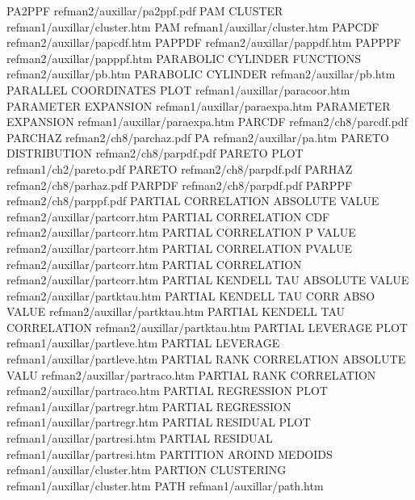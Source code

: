 PA2PPF                                  refman2/auxillar/pa2ppf.pdf
PAM CLUSTER                             refman1/auxillar/cluster.htm
PAM                                     refman1/auxillar/cluster.htm
PAPCDF                                  refman2/auxillar/papcdf.htm
PAPPDF                                  refman2/auxillar/pappdf.htm
PAPPPF                                  refman2/auxillar/papppf.htm
PARABOLIC CYLINDER FUNCTIONS            refman2/auxillar/pb.htm
PARABOLIC CYLINDER                      refman2/auxillar/pb.htm
PARALLEL COORDINATES PLOT               refman1/auxillar/paracoor.htm
PARAMETER EXPANSION                     refman1/auxillar/paraexpa.htm
PARAMETER EXPANSION                     refman1/auxillar/paraexpa.htm
PARCDF                                  refman2/ch8/parcdf.pdf
PARCHAZ                                 refman2/ch8/parchaz.pdf
PA                                      refman2/auxillar/pa.htm
PARETO DISTRIBUTION                     refman2/ch8/parpdf.pdf
PARETO PLOT                             refman1/ch2/pareto.pdf
PARETO                                  refman2/ch8/parpdf.pdf
PARHAZ                                  refman2/ch8/parhaz.pdf
PARPDF                                  refman2/ch8/parpdf.pdf
PARPPF                                  refman2/ch8/parppf.pdf
PARTIAL CORRELATION ABSOLUTE VALUE      refman2/auxillar/partcorr.htm
PARTIAL CORRELATION CDF                 refman2/auxillar/partcorr.htm
PARTIAL CORRELATION P VALUE             refman2/auxillar/partcorr.htm
PARTIAL CORRELATION PVALUE              refman2/auxillar/partcorr.htm
PARTIAL CORRELATION                     refman2/auxillar/partcorr.htm
PARTIAL KENDELL TAU ABSOLUTE VALUE      refman2/auxillar/partktau.htm
PARTIAL KENDELL TAU CORR ABSO VALUE     refman2/auxillar/partktau.htm
PARTIAL KENDELL TAU CORRELATION         refman2/auxillar/partktau.htm
PARTIAL LEVERAGE PLOT                   refman1/auxillar/partleve.htm
PARTIAL LEVERAGE                        refman1/auxillar/partleve.htm
PARTIAL RANK CORRELATION ABSOLUTE VALU  refman2/auxillar/partraco.htm
PARTIAL RANK CORRELATION                refman2/auxillar/partraco.htm
PARTIAL REGRESSION PLOT                 refman1/auxillar/partregr.htm
PARTIAL REGRESSION                      refman1/auxillar/partregr.htm
PARTIAL RESIDUAL PLOT                   refman1/auxillar/partresi.htm
PARTIAL RESIDUAL                        refman1/auxillar/partresi.htm
PARTITION AROIND MEDOIDS                refman1/auxillar/cluster.htm
PARTION CLUSTERING                      refman1/auxillar/cluster.htm
PATH                                    refman1/auxillar/path.htm
